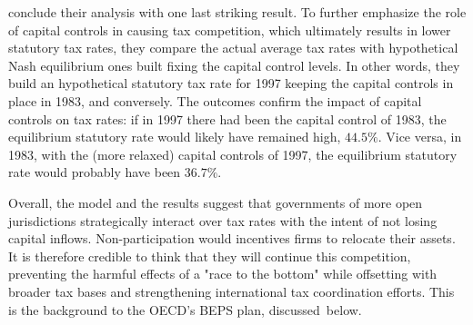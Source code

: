 \textcite{dev-loc-red-08} conclude their analysis with one last striking result. To further emphasize the role of capital controls in causing tax competition, which ultimately results in lower statutory tax rates, they compare the actual average tax rates with hypothetical Nash equilibrium ones built fixing the capital control levels. In other words, they build an hypothetical statutory tax rate for 1997 keeping the capital controls in place in 1983, and conversely. The outcomes confirm the impact of capital controls on tax rates: if in 1997 there had been the capital control of 1983, the equilibrium statutory rate would likely have remained high, $44.5\%$. Vice versa, in 1983, with the (more relaxed) capital controls of 1997, the equilibrium statutory rate would probably have been $36.7\%$.

Overall, the model and the results suggest that governments of more open jurisdictions strategically interact over tax rates with the intent of not losing capital inflows. Non-participation would incentives firms to relocate their assets. It is therefore credible to think that they will continue this competition, preventing the harmful effects of a "race to the bottom" while offsetting with broader tax bases and strengthening international tax coordination efforts. This is the background to the OECD's BEPS plan, discussed~below.
